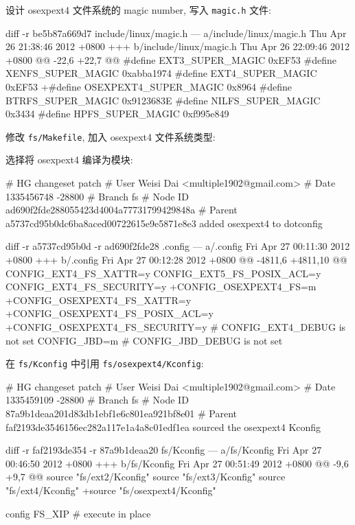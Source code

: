 \documentclass[11pt]{report}
\begin{document}
            设计 osexpext4 文件系统的 magic number, 写入 \verb|magic.h| 文件:

\begin{console}
diff -r be5b87a669d7 include/linux/magic.h
--- a/include/linux/magic.h     Thu Apr 26 21:38:46 2012 +0800
+++ b/include/linux/magic.h     Thu Apr 26 22:09:46 2012 +0800
@@ -22,6 +22,7 @@
 #define EXT3_SUPER_MAGIC       0xEF53
 #define XENFS_SUPER_MAGIC      0xabba1974
 #define EXT4_SUPER_MAGIC       0xEF53
+#define OSEXPEXT4_SUPER_MAGIC  0x8964
 #define BTRFS_SUPER_MAGIC      0x9123683E
 #define NILFS_SUPER_MAGIC      0x3434
 #define HPFS_SUPER_MAGIC       0xf995e849
\end{console}

            修改 \verb|fs/Makefile|, 加入 osexpext4 文件系统类型:


            选择将 osexpext4 编译为模块:

\begin{console}
# HG changeset patch
# User Weisi Dai <multiple1902@gmail.com>
# Date 1335456748 -28800
# Branch fs
# Node ID ad690f2fde288055423d4004a77731799429848a
# Parent  a5737cd95b0dc6ba8aced00722615e9e5871e8e3
added osexpext4 to dotconfig

diff -r a5737cd95b0d -r ad690f2fde28 .config
--- a/.config	Fri Apr 27 00:11:30 2012 +0800
+++ b/.config	Fri Apr 27 00:12:28 2012 +0800
@@ -4811,6 +4811,10 @@
 CONFIG_EXT4_FS_XATTR=y
 CONFIG_EXT5_FS_POSIX_ACL=y
 CONFIG_EXT4_FS_SECURITY=y
+CONFIG_OSEXPEXT4_FS=m
+CONFIG_OSEXPEXT4_FS_XATTR=y
+CONFIG_OSEXPEXT4_FS_POSIX_ACL=y
+CONFIG_OSEXPEXT4_FS_SECURITY=y
 # CONFIG_EXT4_DEBUG is not set
 CONFIG_JBD=m
 # CONFIG_JBD_DEBUG is not set
\end{console}

        在 \verb|fs/Kconfig| 中引用 \verb|fs/osexpext4/Kconfig|:

        \begin{console}
# HG changeset patch
# User Weisi Dai <multiple1902@gmail.com>
# Date 1335459109 -28800
# Branch fs
# Node ID 87a9b1deaa201d83db1ebf1e6c801ea921bf8e01
# Parent  faf2193de3546156ec282a117e1a4a8c01edf1ea
sourced the osexpext4 Kconfig

diff -r faf2193de354 -r 87a9b1deaa20 fs/Kconfig
--- a/fs/Kconfig	Fri Apr 27 00:46:50 2012 +0800
+++ b/fs/Kconfig	Fri Apr 27 00:51:49 2012 +0800
@@ -9,6 +9,7 @@
 source "fs/ext2/Kconfig"
 source "fs/ext3/Kconfig"
 source "fs/ext4/Kconfig"
+source "fs/osexpext4/Kconfig"
 
 config FS_XIP
 # execute in place
        \end{console}
\end{document}
